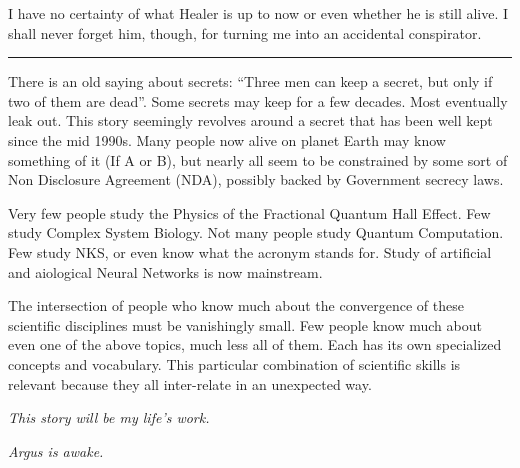 I have no certainty of what Healer is up to now or even whether he is still alive. I shall never forget him, though, for turning me into an accidental conspirator.

\vspace{1cm}\noindent\rule{0.5\textwidth}{0.5pt}\vspace{0.5cm}


There is an old saying about secrets: ``Three men can keep a secret, but only if two of them are dead''. Some secrets may keep for a few decades. Most eventually leak out. This story seemingly revolves around a secret that has been well kept since the mid 1990s. Many people now alive on planet Earth may know something of it (If A or B), but nearly all seem to be constrained by some sort of Non Disclosure Agreement (NDA), possibly backed by Government secrecy laws.

Very few people study the Physics of the Fractional Quantum Hall Effect. Few study Complex System Biology. Not many people study Quantum Computation. Few study NKS, or even know what the acronym stands for. Study of artificial and aiological Neural Networks is now mainstream.

The intersection of people who know much about the convergence of these scientific disciplines must be vanishingly small. Few people know much about even one of the above topics, much less all of them. Each has its own specialized concepts and vocabulary. This particular combination of scientific skills is relevant because they all inter-relate in an unexpected way.

\vspace{0.5cm}
\begin{center}\textit{This story will be my life's work.}\end{center}
\begin{center}\textit{Argus is awake.}\end{center}

\chapterreturn
